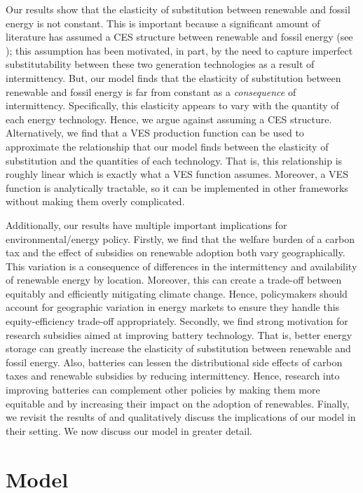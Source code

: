 \documentclass[11pt,a4paper]{extarticle}
\begin{document}
Our results show that the elasticity of substitution between renewable and fossil energy is not constant. This is important because a significant amount of literature has assumed a CES structure between renewable and fossil energy (see \citet{Pap}); this assumption has been motivated, in part, by the need to capture imperfect substitutability between these two generation technologies as a result of intermittency. But, our model finds that the elasticity of substitution between renewable and fossil energy is far from constant as a \textit{consequence} of intermittency. Specifically, this elasticity appears to vary with the quantity of each energy technology. Hence, we argue against assuming a CES structure. Alternatively, we find that a VES production function can be used to approximate the relationship that our model finds between the elasticity of substitution and the quantities of each technology. That is, this relationship is roughly linear which is exactly what a VES function assumes. Moreover, a VES function is analytically tractable, so it can be implemented in other frameworks without making them overly complicated. 

Additionally, our results have multiple important implications for environmental/energy policy. Firstly, we find that the welfare burden of a carbon tax  and the effect of subsidies on renewable adoption both vary geographically. This variation is a consequence of differences in the intermittency and availability of renewable energy by location. Moreover, this can create a trade-off between equitably and efficiently mitigating climate change. Hence, policymakers should account for geographic variation in energy markets to ensure they handle this equity-efficiency trade-off appropriately. Secondly, we find strong motivation for research subsidies aimed at improving battery technology. That is, better energy storage can greatly increase the elasticity of substitution between renewable and fossil energy.  Also, batteries can  lessen the distributional side effects of carbon taxes and renewable subsidies by  reducing intermittency. Hence, research into improving batteries can complement other policies by making them more equitable and by increasing their impact on the adoption of renewables. Finally, we revisit the results of \citet{Ace2012} and qualitatively discuss the implications of our model in their setting. We now discuss our model in greater detail.


\section{Model}
\end{document}
